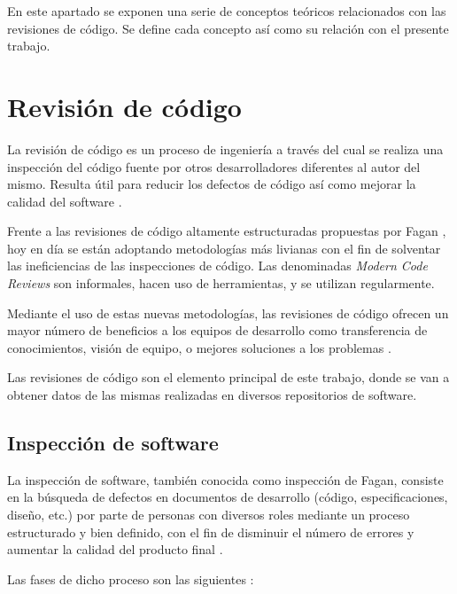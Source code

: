 
En este apartado se exponen una serie de conceptos teóricos relacionados con las revisiones de código. Se define cada concepto así como su relación con el presente trabajo.

\section{Revisión de código}
La revisión de código es un proceso de ingeniería a través del cual se realiza una inspección del código fuente por otros desarrolladores diferentes al autor del mismo. Resulta útil para reducir los defectos de código así como mejorar la calidad del software \cite{28121}.

Frente a las revisiones de código altamente estructuradas propuestas por Fagan \cite{5388086}, hoy en día se están adoptando metodologías más livianas con el fin de solventar las ineficiencias de las inspecciones de código. Las denominadas \emph{Modern Code Reviews} son informales, hacen uso de herramientas, y se utilizan regularmente.

Mediante el uso de estas nuevas metodologías, las revisiones de código ofrecen un mayor número de beneficios a los equipos de desarrollo como transferencia de conocimientos, visión de equipo, o mejores soluciones a los problemas \cite{Bacchelli:2013:EOC:2486788.2486882}.

Las revisiones de código son el elemento principal de este trabajo, donde se van a obtener datos de las mismas realizadas en diversos repositorios de software.

\subsection{Inspección de software}
La inspección de software, también conocida como inspección de Fagan, consiste en la búsqueda de defectos en documentos de desarrollo (código, especificaciones, diseño, etc.) por parte de personas con diversos roles mediante un proceso estructurado y bien definido, con el fin de disminuir el número de errores y aumentar la calidad del producto final \cite{5388086}.

Las fases de dicho proceso son las siguientes \cite{Fagan:1986:ASI:10677.2412491}:

